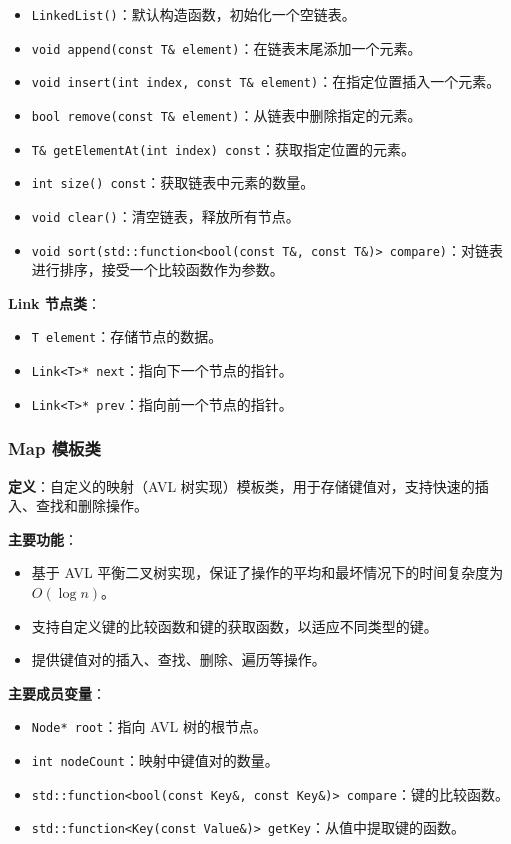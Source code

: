 \documentclass[UTF8, a4paper,12pt]{ctexart}
\begin{document}
\begin{itemize}
    \item \texttt{LinkedList()}：默认构造函数，初始化一个空链表。
    \item \texttt{void append(const T\& element)}：在链表末尾添加一个元素。
    \item \texttt{void insert(int index, const T\& element)}：在指定位置插入一个元素。
    \item \texttt{bool remove(const T\& element)}：从链表中删除指定的元素。
    \item \texttt{T\& getElementAt(int index) const}：获取指定位置的元素。
    \item \texttt{int size() const}：获取链表中元素的数量。
    \item \texttt{void clear()}：清空链表，释放所有节点。
    \item \texttt{void sort(std::function<bool(const T\&, const T\&)> compare)}：对链表进行排序，接受一个比较函数作为参数。
\end{itemize}

\textbf{Link 节点类}：

\begin{itemize}
    \item \texttt{T element}：存储节点的数据。
    \item \texttt{Link<T>* next}：指向下一个节点的指针。
    \item \texttt{Link<T>* prev}：指向前一个节点的指针。
\end{itemize}

\subsubsection{Map 模板类}

\textbf{定义}：自定义的映射（AVL 树实现）模板类，用于存储键值对，支持快速的插入、查找和删除操作。

\textbf{主要功能}：

\begin{itemize}
    \item 基于 AVL 平衡二叉树实现，保证了操作的平均和最坏情况下的时间复杂度为 $O(\log n)$。
    \item 支持自定义键的比较函数和键的获取函数，以适应不同类型的键。
    \item 提供键值对的插入、查找、删除、遍历等操作。
\end{itemize}

\textbf{主要成员变量}：

\begin{itemize}
    \item \texttt{Node* root}：指向 AVL 树的根节点。
    \item \texttt{int nodeCount}：映射中键值对的数量。
    \item \texttt{std::function<bool(const Key\&, const Key\&)> compare}：键的比较函数。
    \item \texttt{std::function<Key(const Value\&)> getKey}：从值中提取键的函数。
\end{itemize}
\end{document}
